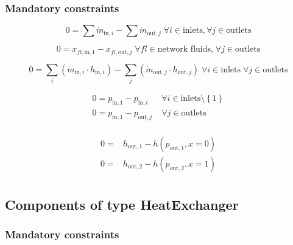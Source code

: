 \documentclass[]{article}
\begin{document}
\subsubsection{Mandatory constraints}

\begin{equation}
\label{eq:Drum_mass_flow_constraints}
0 =\sum\dot{m}_{\mathrm{in},i}-\sum\dot{m}_{\mathrm{out},j}\;\forall i \in \text{inlets}, \forall j \in \text{outlets}
\end{equation}

\begin{equation}
\label{eq:Drum_fluid_constraints}
0 = x_{fl\mathrm{,in,1}} - x_{fl\mathrm{,out,}j}\; \forall fl \in \text{network fluids,} \; \forall j \in\text{outlets}
\end{equation}

\begin{equation}
\label{eq:Drum_energy_balance_constraints}
0=\sum_i\left(\dot{m}_{\mathrm{in,}i}\cdot h_{\mathrm{in,}i}\right) - \sum_j \left(\dot{m}_{\mathrm{out,}j} \cdot h_{\mathrm{out,}j} \right) \; \forall i \in \text{inlets} \;\forall j \in \text{outlets}
\end{equation}

\begin{equation}
\label{eq:Drum_pressure_constraints}
\begin{split}
0 = p_\mathrm{in,1} - p_{\mathrm{in,}i} & \; \forall i \in \text{inlets} \setminus \left\lbrace 1\right\rbrace\\
0 = p_\mathrm{in,1} - p_{\mathrm{out,}j} & \; \forall j \in \text{outlets}\\
\end{split}
\end{equation}

\begin{equation}
\label{eq:Drum_outlet_constraints}
\begin{split}
0 =&h_\mathrm{out,1} -h\left(p_\mathrm{out,1}, x=0\right)\\0 =&h_\mathrm{out,2} -h\left(p_\mathrm{out,2}, x=1\right)\\\end{split}
\end{equation}


\subsection{Components of type HeatExchanger}

\subsubsection{Mandatory constraints}
\end{document}
